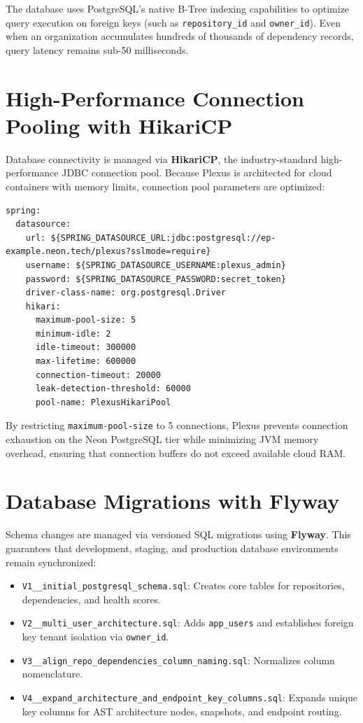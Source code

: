 \documentclass[11pt,a4paper,openany]{report}
\begin{document}
The database uses PostgreSQL's native B-Tree indexing capabilities to optimize query execution on foreign keys (such as \texttt{repository\_id} and \texttt{owner\_id}). Even when an organization accumulates hundreds of thousands of dependency records, query latency remains sub-50 milliseconds.

\section{High-Performance Connection Pooling with HikariCP}
Database connectivity is managed via \textbf{HikariCP}, the industry-standard high-performance JDBC connection pool. Because Plexus is architected for cloud containers with memory limits, connection pool parameters are optimized:

\begin{lstlisting}[caption={HikariCP Connection Pool Configuration in application.yml}]
spring:
  datasource:
    url: ${SPRING_DATASOURCE_URL:jdbc:postgresql://ep-example.neon.tech/plexus?sslmode=require}
    username: ${SPRING_DATASOURCE_USERNAME:plexus_admin}
    password: ${SPRING_DATASOURCE_PASSWORD:secret_token}
    driver-class-name: org.postgresql.Driver
    hikari:
      maximum-pool-size: 5
      minimum-idle: 2
      idle-timeout: 300000
      max-lifetime: 600000
      connection-timeout: 20000
      leak-detection-threshold: 60000
      pool-name: PlexusHikariPool
\end{lstlisting}

By restricting \texttt{maximum-pool-size} to 5 connections, Plexus prevents connection exhaustion on the Neon PostgreSQL tier while minimizing JVM memory overhead, ensuring that connection buffers do not exceed available cloud RAM.

\section{Database Migrations with Flyway}
Schema changes are managed via versioned SQL migrations using \textbf{Flyway}. This guarantees that development, staging, and production database environments remain synchronized:
\begin{itemize}[leftmargin=1.2cm]
    \item \texttt{V1\_\_initial\_postgresql\_schema.sql}: Creates core tables for repositories, dependencies, and health scores.
    \item \texttt{V2\_\_multi\_user\_architecture.sql}: Adds \texttt{app\_users} and establishes foreign key tenant isolation via \texttt{owner\_id}.
    \item \texttt{V3\_\_align\_repo\_dependencies\_column\_naming.sql}: Normalizes column nomenclature.
    \item \texttt{V4\_\_expand\_architecture\_and\_endpoint\_key\_columns.sql}: Expands unique key columns for AST architecture nodes, snapshots, and endpoint routing.
\end{itemize}
\end{document}
